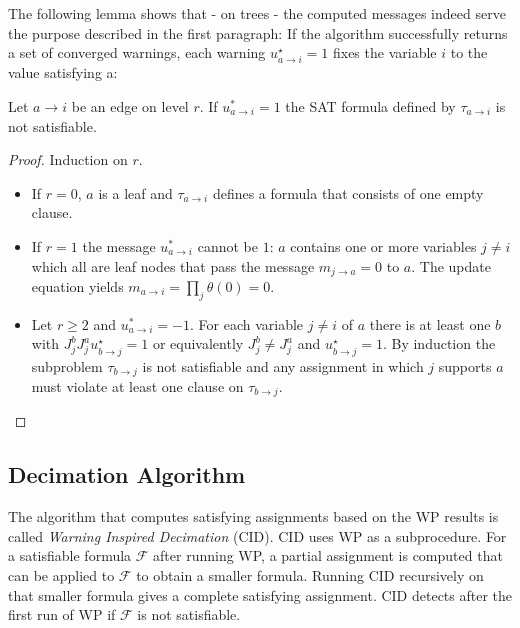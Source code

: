 The following lemma shows that - on trees - the computed messages indeed serve the purpose described in the first paragraph: If the algorithm successfully returns a set of converged warnings, each warning $u^{\star}_{a \rightarrow i} = 1$ fixes the variable $i$ to the value satisfying a:

\begin{lemma}\cite{survprob} Let $a \rightarrow i$ be an edge on level $r$. \newline
If $u^{\ast}_{a \rightarrow i} = 1$ the SAT formula defined by $\tau_{a \rightarrow i}$ is not satisfiable.

\begin{proof} Induction on $r$.
\begin{itemize}
	\item If $r = 0$, $a$ is a leaf and $\tau_{a \rightarrow i}$ defines a formula that consists of one empty clause.
	\item If $r = 1$ the message $u^{\ast}_{a \rightarrow i}$ cannot be $1$: $a$ contains one or more variables $j \neq i$ which all are leaf nodes that pass the message $m_{j \rightarrow a} = 0$ to $a$. The update equation yields $m_{a \rightarrow i} = \prod_j \theta(0) = 0$.
	\item Let $r \geq 2$ and $u^{\ast}_{a \rightarrow i} = -1$. For each variable $j \neq i$ of $a$ there is at least one $b$ with $J_j^b J_j^a u^\star_{b \rightarrow j}= 1$ or equivalently $J_j^b \neq J_j^a$ and  $u^\star_{b \rightarrow j} = 1$. By induction the subproblem $\tau_{b \rightarrow j}$ is not satisfiable and any assignment in which $j$ supports $a$ must violate at least one clause on $\tau_{b \rightarrow j}$.
\end{itemize}
\end{proof}
\end{lemma}



\subsection{Decimation Algorithm}

The algorithm that computes satisfying assignments based on the WP results is called \emph{Warning Inspired Decimation} (CID). CID uses WP as a subprocedure. For a satisfiable formula $\mathcal{F}$ after running WP, a partial assignment is computed that can be applied to $\mathcal{F}$ to obtain a smaller formula. Running CID recursively on that smaller formula gives a complete satisfying assignment. CID detects after the first run of WP if $\mathcal{F}$ is not satisfiable. \newline

